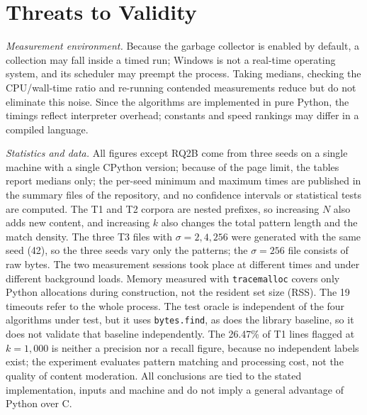 \documentclass[conference]{IEEEtran}
\begin{document}
\section{Threats to Validity}
\emph{Measurement environment.} Because the garbage collector is enabled by default, a collection may fall inside a timed run; Windows is not a real-time operating system, and its scheduler may preempt the process. Taking medians, checking the CPU/wall-time ratio and re-running contended measurements reduce but do not eliminate this noise. Since the algorithms are implemented in pure Python, the timings reflect interpreter overhead; constants and speed rankings may differ in a compiled language.

\emph{Statistics and data.} All figures except RQ2B come from three seeds on a single machine with a single CPython version; because of the page limit, the tables report medians only; the per-seed minimum and maximum times are published in the summary files of the repository, and no confidence intervals or statistical tests are computed. The T1 and T2 corpora are nested prefixes, so increasing $N$ also adds new content, and increasing $k$ also changes the total pattern length and the match density. The three T3 files with $\sigma=2,4,256$ were generated with the same seed (42), so the three seeds vary only the patterns; the $\sigma=256$ file consists of raw bytes. The two measurement sessions took place at different times and under different background loads. Memory measured with \texttt{tracemalloc} covers only Python allocations during construction, not the resident set size (RSS). The 19 timeouts refer to the whole process. The test oracle is independent of the four algorithms under test, but it uses \texttt{bytes.find}, as does the library baseline, so it does not validate that baseline independently. The 26.47\% of T1 lines flagged at $k=1{,}000$ is neither a precision nor a recall figure, because no independent labels exist; the experiment evaluates pattern matching and processing cost, not the quality of content moderation. All conclusions are tied to the stated implementation, inputs and machine and do not imply a general advantage of Python over C.

\balance
\end{document}
